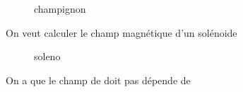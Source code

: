 



\begin{figure}[ht]
    \centering
    \caption{champignon}
    \label{fig:champignon}
\end{figure}
	
On veut calculer le champ magnétique d'un solénoide


\begin{figure}[ht]
    \centering
    \caption{soleno}
    \label{fig:soleno}
\end{figure}

On a que le champ de doit pas dépende de 


